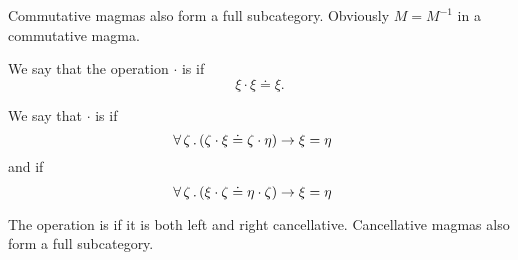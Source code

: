 \begin{definition}
\begin{thmenum}[resume=def:magma]
    Commutative magmas also form a full subcategory. Obviously \( M = M^{-1} \) in a commutative magma.

     We say that the operation \( \cdot \) is  if
    \begin{equation}\label{eq:def:magma/idempotent}
      \xi \cdot \xi \doteq \xi.
    \end{equation}

     We say that \( \cdot \) is  if
    \begin{equation}\label{eq:def:magma/cancellative/left}
      \forall \thinspace \zeta \thinspace . \thinspace (\zeta \cdot \xi \doteq \zeta \cdot \eta) \rightarrow \xi = \eta
      \quad
    \end{equation}
    and  if
    \begin{equation}\label{eq:def:magma/cancellative/right}
      \forall \thinspace \zeta \thinspace . \thinspace (\xi \cdot \zeta \doteq \eta \cdot \zeta) \rightarrow \xi = \eta
      \quad
    \end{equation}

    The operation is  if it is both left and right cancellative. Cancellative magmas also form a full subcategory.
  \end{thmenum}
\end{definition}

